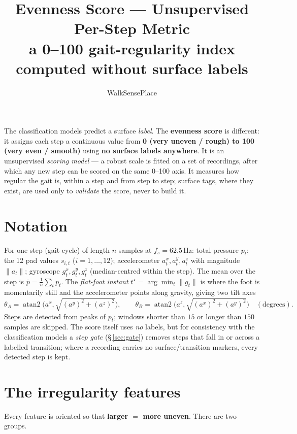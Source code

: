 \documentclass[11pt]{article}
\title{\textbf{Evenness Score --- Unsupervised Per-Step Metric}\\[2pt]
\large a 0--100 gait-regularity index computed without surface labels}
\author{WalkSensePlace}
\date{}
\begin{document}
\maketitle

The classification models predict a surface \emph{label}. The \textbf{evenness score} is different:
it assigns each step a continuous value from \textbf{0 (very uneven / rough) to 100 (very even /
smooth)} using \textbf{no surface labels anywhere}. It is an unsupervised \emph{scoring model} --- a
robust scale is fitted on a set of recordings, after which any new step can be scored on the same
0--100 axis. It measures how regular the gait is, within a step and from step to step; surface tags,
where they exist, are used only to \emph{validate} the score, never to build it.

\section*{Notation}
For one step (gait cycle) of length $n$ samples at $f_s=62.5$\,Hz: total pressure $p_t$; the 12 pad
values $s_{i,t}$ ($i=1,\dots,12$); accelerometer $a^{x}_t,a^{y}_t,a^{z}_t$ with magnitude
$\lVert a_t\rVert$; gyroscope $g^{x}_t,g^{y}_t,g^{z}_t$ (median-centred within the step). The mean
over the step is $\bar p=\tfrac1n\sum_t p_t$. The \emph{flat-foot instant}
$t^\star=\arg\min_t \lVert g_t\rVert$ is where the foot is momentarily still and the accelerometer
points along gravity, giving two tilt axes
\[
\theta_A=\operatorname{atan2}\!\bigl(a^x,\sqrt{(a^y)^2+(a^z)^2}\bigr),\qquad
\theta_B=\operatorname{atan2}\!\bigl(a^z,\sqrt{(a^x)^2+(a^y)^2}\bigr)\quad(\text{degrees}).
\]
Steps are detected from peaks of $p_t$; windows shorter than $15$ or longer than $150$ samples are
skipped. The score itself uses \emph{no} labels, but for consistency with the classification
models a \emph{step gate} (\S\,\ref{sec:gate}) removes steps that fall in or across a labelled
transition; where a recording carries no surface/transition markers, every detected step is kept.

\section{The irregularity features}
Every feature is oriented so that \textbf{larger $=$ more uneven}. There are two groups.
\end{document}
